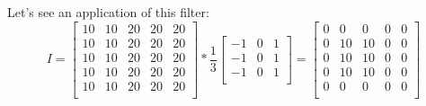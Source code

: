 \begin{itemize}
\begin{center}
\begin{figure}[ht]
\begin{minipage}{0.45\linewidth}
        \centering
        \end{minipage}
        \hspace{5pt}
        \begin{minipage}{0.45\linewidth}
        \centering
        \end{minipage}
    \end{figure}
    \end{center}
    Let's see an application of this filter:
    \[
    I = 
    \begin{bmatrix}
        10 & 10 & 20 & 20 & 20\\
        10 & 10 & 20 & 20 & 20\\
        10 & 10 & 20 & 20 & 20\\
        10 & 10 & 20 & 20 & 20\\
        10 & 10 & 20 & 20 & 20\\
    \end{bmatrix}
    *\frac{1}{3}
    \begin{bmatrix}
       -1 & 0 & 1\\
       -1 & 0 & 1\\
       -1 & 0 & 1\\
    \end{bmatrix}
    =
    \begin{bmatrix}
       0 & 0 & 0 & 0 & 0\\
       0 & 10 & 10 & 0 & 0\\
       0 & 10 & 10 & 0 & 0\\
       0 & 10 & 10 & 0 & 0\\
       0 & 0 & 0 & 0 & 0\\

\end{bmatrix}\]
\end{itemize}
